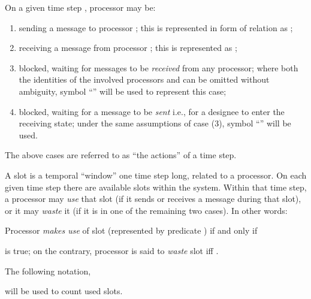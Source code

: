 \documentclass{elsart}
\begin{document}
\begin{defn}[actions]
On a given time step , processor  may be:
  \begin{enumerate}
    \item sending a message to processor ; this is represented in form of relation as ;
    \item receiving a message from processor ; this is represented as ;
    \item blocked, waiting for messages to be \emph{received\/} from any processor; 
    where both the identities
    of the involved processors and  can be omitted without
    ambiguity, symbol ``'' will be used to represent this case;
    \item blocked, waiting for a message to be \emph{sent\/} i.e., for a designee
    to enter the receiving state;
    under the same assumptions of case (3), symbol ``''
    will be used.
  \end{enumerate}
The above cases are referred to as ``the actions'' of a time step.
\end{defn}

\begin{defn}
A slot is a temporal ``window'' one time step long, related to a processor.
On each given time step there are  available slots within the system.
Within that time step, a processor may \emph{use\/} that slot 
(if it sends or receives a message during that slot), or it may 
\emph{waste\/} it (if it is in one of the remaining two cases). In other words:

\noindent
Processor  \emph{makes use\/} of slot  
(represented by predicate )
if and only if

\noindent
is true; on the contrary, processor  is said to \emph{waste\/} slot  if{}f .

\noindent
The following notation,

will be used to count used slots.
\end{defn}
\end{document}
